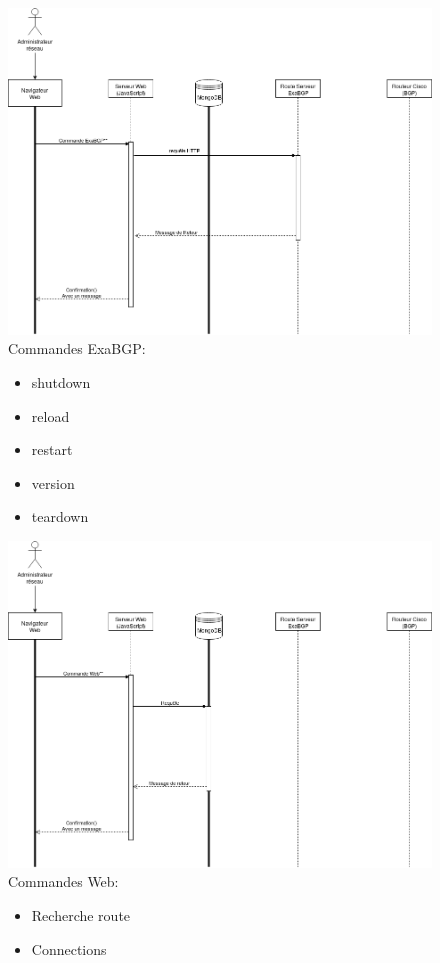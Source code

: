 \begin{figure}[h]
\includegraphics[scale = 0.5]{img/diagramme_de_sequence2.png}
Commandes ExaBGP:
\begin{itemize}
\item shutdown
\item reload 
\item restart 
\item version
\item teardown
\end{itemize}
\end{figure}


\begin{figure}[h]
\includegraphics[scale = 0.5]{img/diagramme_de_sequence3.png}
Commandes Web:
\begin{itemize}
\item Recherche route
\item Connections
\end{itemize}
\end{figure}

